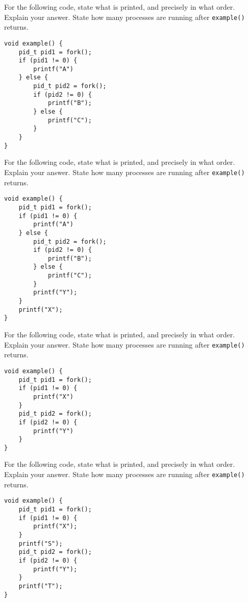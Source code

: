 \frmrule


\begin{example}
For the following code, state what is printed, and precisely in what order.
Explain your answer. State how many processes are running 
after \lstinline{example()} returns.
\begin{lstlisting}
void example() {
    pid_t pid1 = fork();
    if (pid1 != 0) {
        printf("A")
    } else {
        pid_t pid2 = fork();
        if (pid2 != 0) {
            printf("B");
        } else {
            printf("C");
        }
    } 
}
\end{lstlisting}
\end{example}


\frmrule

\begin{example}
For the following code, state what is printed, and precisely in what order.
Explain your answer. State how many processes are running 
after \lstinline{example()} returns.
\begin{lstlisting}
void example() {
    pid_t pid1 = fork();
    if (pid1 != 0) {
        printf("A")
    } else {
        pid_t pid2 = fork();
        if (pid2 != 0) {
            printf("B");
        } else {
            printf("C");
        }
        printf("Y");
    } 
    printf("X");
}
\end{lstlisting}
\end{example}

\frmrule

\begin{example}
For the following code, state what is printed, and precisely in what order.
Explain your answer. State how many processes are running 
after \lstinline{example()} returns.
\begin{lstlisting}
void example() {
    pid_t pid1 = fork();
    if (pid1 != 0) {
        printf("X")
    }
    pid_t pid2 = fork();
    if (pid2 != 0) {
        printf("Y")
    }
}
\end{lstlisting}
\end{example}

\frmrule

\begin{example}
For the following code, state what is printed, and precisely in what order.
Explain your answer. State how many processes are running 
after \lstinline{example()} returns.
\begin{lstlisting}
void example() {
    pid_t pid1 = fork();
    if (pid1 != 0) {
        printf("X");
    }
    printf("S");
    pid_t pid2 = fork();
    if (pid2 != 0) {
        printf("Y");
    }
    printf("T");
}
\end{lstlisting}
\end{example}

